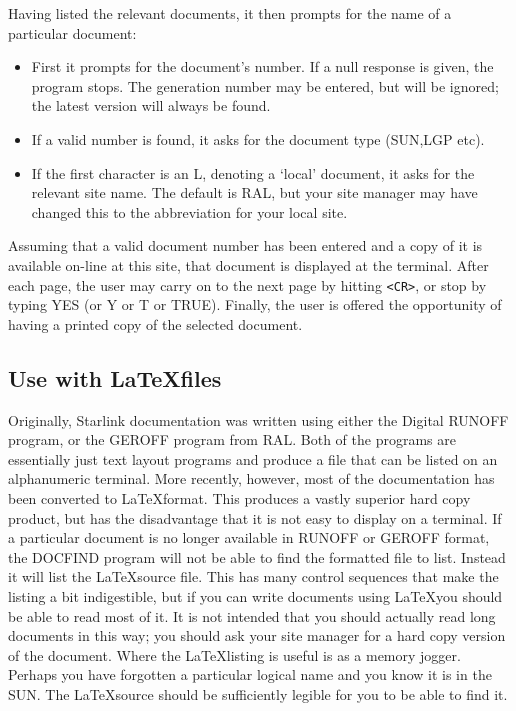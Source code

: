 Having listed the relevant documents, it then prompts for the name of a
particular document:

\begin{itemize}
\item First it prompts for the document's number. If a null response is given,
the program stops. The generation number may be entered, but will be ignored;
the latest version will always be found.
\item If a valid number is found, it asks for the document type (SUN,LGP etc).
\item If the first character is an L, denoting a `local' document, it asks for
the relevant site name. The default is RAL, but your site manager may have
changed this to the abbreviation for your local site.
\end{itemize}

Assuming that a valid document number has been entered and a copy of it is
available on-line at this site, that document is displayed at the terminal.
After each page, the user may carry on to the next page by hitting \verb+<CR>+,
or stop by typing YES (or Y or T or TRUE). Finally, the user is offered the
opportunity of having a printed copy of the selected document.

\subsection{Use with \LaTeX files}

Originally, Starlink documentation was written using either the Digital RUNOFF
program, or the GEROFF program from RAL. Both of the programs are essentially
just text layout programs and produce a file that can be listed on an
alphanumeric terminal. More recently, however, most of the documentation has
been converted to \LaTeX format. This produces a vastly superior hard copy
product, but has the disadvantage that it is not easy to display on a
terminal. If a particular document is no longer available in RUNOFF or GEROFF
format, the DOCFIND program will not be able to find the formatted file to list.
Instead it will list the \LaTeX source file. This has many control sequences
that make the listing a bit indigestible, but if you can write documents using
\LaTeX you should be able to read most of it. It is not intended that you should
actually read long documents in this way; you should ask your site manager for
a hard copy version of the document. Where the \LaTeX listing is useful is as a
memory jogger. Perhaps you have forgotten a particular logical name and you
know it is in the SUN. The \LaTeX source should be sufficiently legible for you
to be able to find it.

